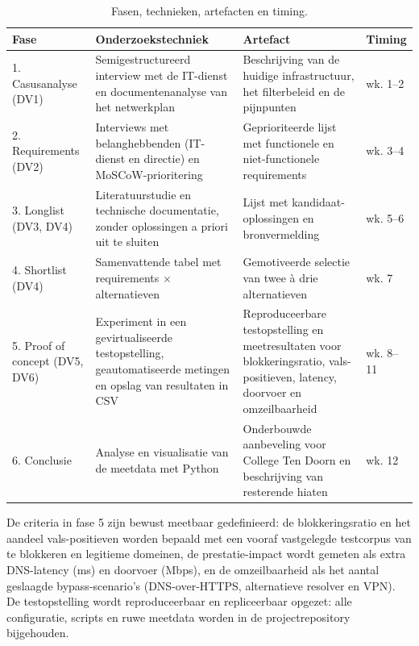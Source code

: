 \documentclass{hogent-article}
\begin{document}
\begin{table}
    \centering
    \small
    \begin{tabular}{p{2.3cm}p{4.7cm}p{4.8cm}p{1.3cm}}
        \toprule
        \textbf{Fase} & \textbf{Onderzoekstechniek} & \textbf{Artefact} & \textbf{Timing} \\
        \midrule
        1. Casusanalyse (DV1) & Semigestructureerd interview met de IT-dienst en documentenanalyse van het netwerkplan & Beschrijving van de huidige infrastructuur, het filterbeleid en de pijnpunten & wk. 1--2 \\
        2. Requirements (DV2) & Interviews met belanghebbenden (IT-dienst en directie) en MoSCoW-prioritering & Geprioriteerde lijst met functionele en niet-functionele requirements & wk. 3--4 \\
        3. Longlist (DV3, DV4) & Literatuurstudie en technische documentatie, zonder oplossingen a priori uit te sluiten & Lijst met kandidaat-oplossingen en bronvermelding & wk. 5--6 \\
        4. Shortlist (DV4) & Samenvattende tabel met requirements $\times$ alternatieven & Gemotiveerde selectie van twee à drie alternatieven & wk. 7 \\
        5. Proof of concept (DV5, DV6) & Experiment in een gevirtualiseerde testopstelling, geautomatiseerde metingen en opslag van resultaten in CSV & Reproduceerbare testopstelling en meetresultaten voor blokkeringsratio, vals-positieven, latency, doorvoer en omzeilbaarheid & wk. 8--11 \\
        6. Conclusie & Analyse en visualisatie van de meetdata met Python & Onderbouwde aanbeveling voor College Ten Doorn en beschrijving van resterende hiaten & wk. 12 \\
        \bottomrule
    \end{tabular}
    \caption{Fasen, technieken, artefacten en timing.}
    \label{tab:fasen-spec}
\end{table}

De criteria in fase 5 zijn bewust meetbaar gedefinieerd: de blokkeringsratio en het aandeel vals-positieven worden bepaald met een vooraf vastgelegde testcorpus van te blokkeren en legitieme domeinen, de prestatie-impact wordt gemeten als extra DNS-latency (ms) en doorvoer (Mbps), en de omzeilbaarheid als het aantal geslaagde bypass-scenario's (DNS-over-HTTPS, alternatieve resolver en VPN). De testopstelling wordt reproduceerbaar en repliceerbaar opgezet: alle configuratie, scripts en ruwe meetdata worden in de projectrepository bijgehouden.

\printbibliography[heading=bibintoc]
\end{document}
